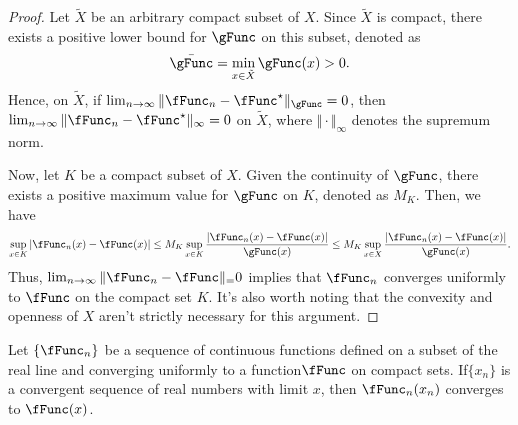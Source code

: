 \documentclass[\econtexRoot/BufferStockTheory]{subfiles}
\begin{document}
\begin{proof}
Let $\tilde{X}$ be an arbitrary compact subset of $X$.
Since $\tilde{X}$ is compact, there exists a positive lower bound for $\gFunc$ on this subset, denoted as 
\begin{equation}
\bar{\gFunc} = \min_{x \in \tilde{X}} \gFunc(x) > 0.
\end{equation}
Hence, on $\tilde{X}$, if $\lim_{n \to \infty} \Vert \fFunc_n - \fFunc^{\star} \Vert_\gFunc = 0$, then $\lim_{n \to \infty} \Vert \fFunc_n - \fFunc^{\star} \Vert_\infty = 0$ on $\tilde{X}$, where $\Vert \cdot \Vert_\infty$ denotes the supremum norm.


Now, let $K$ be a compact subset of $X$.
Given the continuity of $\gFunc$, there exists a positive maximum value for $\gFunc$ on $K$, denoted as $M_K$.
Then, we have
\begin{equation}
\sup_{x \in K} \vert \fFunc_n(x) - \fFunc(x)\vert  \leq M_K \sup_{x \in K} \frac{\vert \fFunc_n(x) - \fFunc(x)\vert }{\gFunc(x)} \leq M_K \sup_{x \in X} \frac{\vert \fFunc_n(x) - \fFunc(x)\vert }{\gFunc(x)}.
\end{equation}
Thus, $\lim_{n \to \infty} \Vert \fFunc_n - \fFunc \Vert_  = 0$ implies that $\fFunc_n$ converges uniformly to $\fFunc$ on the compact set $K$.
It's also worth noting that the convexity and openness of $X$ aren't strictly necessary for this argument.
\end{proof}

\begin{fact}\label{fact:compactnt}
Let $\{\fFunc_n\}$ be a sequence of continuous functions defined on a subset of the real line and converging uniformly to a function$\fFunc$ on compact sets. If$\{x_n\}$ is a convergent sequence of real numbers with limit $x$, then $\fFunc_n(x_n)$ converges to $\fFunc(x)$.
\end{fact}
\end{document}
